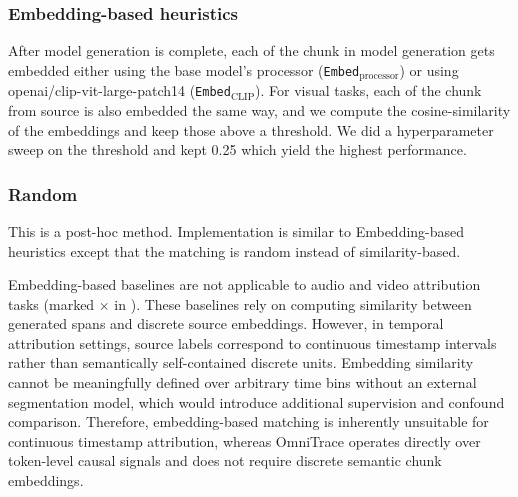\subsubsection{Embedding-based heuristics}
After model generation is complete, each of the chunk in model generation gets embedded either using the base model's processor (\texttt{Embed$_{\text{processor}}$}) or using openai/clip-vit-large-patch14 (\texttt{Embed$_{\text{CLIP}}$}). For visual tasks, each of the chunk from source is also embedded the same way, and we compute the cosine-similarity of the embeddings and keep those above a threshold. We did a hyperparameter sweep on the threshold and kept 0.25 which yield the highest performance.

\subsubsection{Random}
This is a post-hoc method. Implementation is similar to Embedding-based heuristics except that the matching is random instead of similarity-based.

Embedding-based baselines are not applicable to audio and video attribution tasks (marked $\times$ in ). These baselines rely on computing similarity between generated spans and discrete source embeddings. However, in temporal attribution settings, source labels correspond to continuous timestamp intervals rather than semantically self-contained discrete units.
Embedding similarity cannot be meaningfully defined over arbitrary time bins without an external segmentation model, which would introduce additional supervision and confound comparison.
Therefore, embedding-based matching is inherently unsuitable for continuous timestamp attribution, whereas OmniTrace operates directly over token-level causal signals and does not require discrete semantic chunk embeddings.